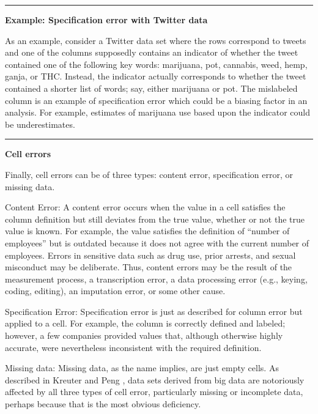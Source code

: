 \documentclass[]{krantz}
\begin{document}
\begin{center}\rule{0.5\linewidth}{\linethickness}\end{center}

\textbf{Example: Specification error with Twitter data}

As an example, consider a Twitter data set where the rows correspond to
tweets and one of the columns supposedly contains an indicator of
whether the tweet contained one of the following key words: marijuana,
pot, cannabis, weed, hemp, ganja, or THC. Instead, the indicator
actually corresponds to whether the tweet contained a shorter list of
words; say, either marijuana or pot. The mislabeled column is an example
of specification error which could be a biasing factor in an analysis.
For example, estimates of marijuana use based upon the indicator could
be underestimates.

\begin{center}\rule{0.5\linewidth}{\linethickness}\end{center}

\textbf{Cell errors}

Finally, cell errors can be of three types: content error, specification
error, or missing data.

Content Error: A content error occurs when the value in a cell satisfies
the column definition but still deviates from the true value, whether or
not the true value is known. For example, the value satisfies the
definition of ``number of employees'' but is outdated because it does
not agree with the current number of employees. Errors in sensitive data
such as drug use, prior arrests, and sexual misconduct may be
deliberate. Thus, content errors may be the result of the measurement
process, a transcription error, a data processing error (e.g., keying,
coding, editing), an imputation error, or some other cause.

Specification Error: Specification error is just as described for column
error but applied to a cell. For example, the column is correctly
defined and labeled; however, a few companies provided values that,
although otherwise highly accurate, were nevertheless inconsistent with
the required definition.

Missing data: Missing data, as the name implies, are just empty cells.
As described in Kreuter and Peng \citeyearpar{kreuter201412}, data sets
derived from big data are notoriously affected by all three types of
cell error, particularly missing or incomplete data, perhaps because
that is the most obvious deficiency.
\end{document}
